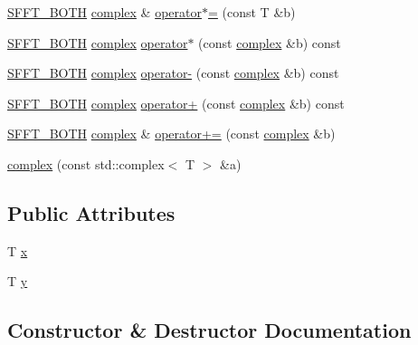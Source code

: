 \begin{DoxyCompactItemize}
\item 
\hyperlink{simplefft_8h_acfebaca1d9d8f48864704773594876b7}{S\+F\+F\+T\+\_\+\+B\+O\+TH} \hyperlink{structsfft_1_1complex}{complex} \& \hyperlink{structsfft_1_1complex_a4c35e8763f5fddfb6bf0529e00d25860}{operator$\ast$=} (const T \&b)
\item 
\hyperlink{simplefft_8h_acfebaca1d9d8f48864704773594876b7}{S\+F\+F\+T\+\_\+\+B\+O\+TH} \hyperlink{structsfft_1_1complex}{complex} \hyperlink{structsfft_1_1complex_a47e6dfd07151ebf89d2bea45e4bc8589}{operator$\ast$} (const \hyperlink{structsfft_1_1complex}{complex} \&b) const 
\item 
\hyperlink{simplefft_8h_acfebaca1d9d8f48864704773594876b7}{S\+F\+F\+T\+\_\+\+B\+O\+TH} \hyperlink{structsfft_1_1complex}{complex} \hyperlink{structsfft_1_1complex_a6b6b1333eab666441255bd2d64dcaf0c}{operator-\/} (const \hyperlink{structsfft_1_1complex}{complex} \&b) const 
\item 
\hyperlink{simplefft_8h_acfebaca1d9d8f48864704773594876b7}{S\+F\+F\+T\+\_\+\+B\+O\+TH} \hyperlink{structsfft_1_1complex}{complex} \hyperlink{structsfft_1_1complex_a36befb2eed269d8171b33bde285539e4}{operator+} (const \hyperlink{structsfft_1_1complex}{complex} \&b) const 
\item 
\hyperlink{simplefft_8h_acfebaca1d9d8f48864704773594876b7}{S\+F\+F\+T\+\_\+\+B\+O\+TH} \hyperlink{structsfft_1_1complex}{complex} \& \hyperlink{structsfft_1_1complex_a590d66355d3fd085e594e47339f02d06}{operator+=} (const \hyperlink{structsfft_1_1complex}{complex} \&b)
\item 
\hyperlink{structsfft_1_1complex_a13433f4d6bd5aa2a5609b2877b5b1d7f}{complex} (const std\+::complex$<$ T $>$ \&a)
\end{DoxyCompactItemize}
\subsection*{Public Attributes}
\begin{DoxyCompactItemize}
\item 
T \hyperlink{structsfft_1_1complex_abce667bde1aace2b50483797715d92f5}{x}
\item 
T \hyperlink{structsfft_1_1complex_adf9d36505422dd34ae49c7051d4404ec}{y}
\end{DoxyCompactItemize}


\subsection{Constructor \& Destructor Documentation}
